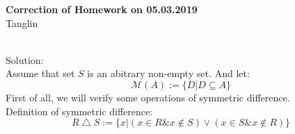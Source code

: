 \documentclass[12pt]{article}
\theoremstyle{neosn}
\begin{document}
    \begin{center}
        {\bf Correction of Homework on 05.03.2019}\\
        Tanglin
    \end{center}
    
    \\
    Solution:\\
    Assume that set $S$ is an abitrary non-empty set. And let:
    $$ \mathscr{M}(A):=\{D|D\subseteq A\} $$
    First of all, we will verify some operations of symmetric difference.\\
    Definition of symmetric difference:
    $$ R \bigtriangleup S:= \{x|(x\in R \& x \notin S) \lor (x\in S \& x\notin R)\} $$
\end{document}
